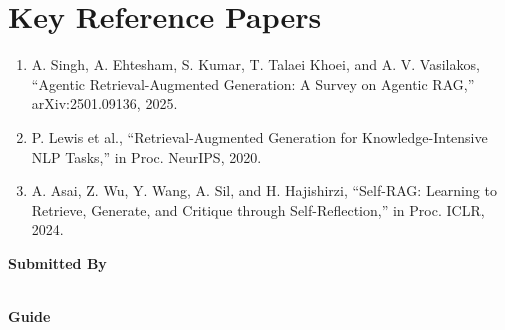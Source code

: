 \documentclass[11pt]{article}
\begin{document}
\section*{Key Reference Papers}
\begin{enumerate}
  \item A. Singh, A. Ehtesham, S. Kumar, T. Talaei Khoei, and A. V. Vasilakos, ``Agentic Retrieval-Augmented Generation: A Survey on Agentic RAG,'' arXiv:2501.09136, 2025.
  \item P. Lewis et al., ``Retrieval-Augmented Generation for Knowledge-Intensive NLP Tasks,'' in Proc. NeurIPS, 2020.
  \item A. Asai, Z. Wu, Y. Wang, A. Sil, and H. Hajishirzi, ``Self-RAG: Learning to Retrieve, Generate, and Critique through Self-Reflection,'' in Proc. ICLR, 2024.
\end{enumerate}
\vspace{0.8em}
\noindent\textbf{Submitted By}\\
\seminarName\\
\seminarRoll

\vspace{0.6em}
\noindent\textbf{Guide}\\
\seminarGuide
\end{document}

